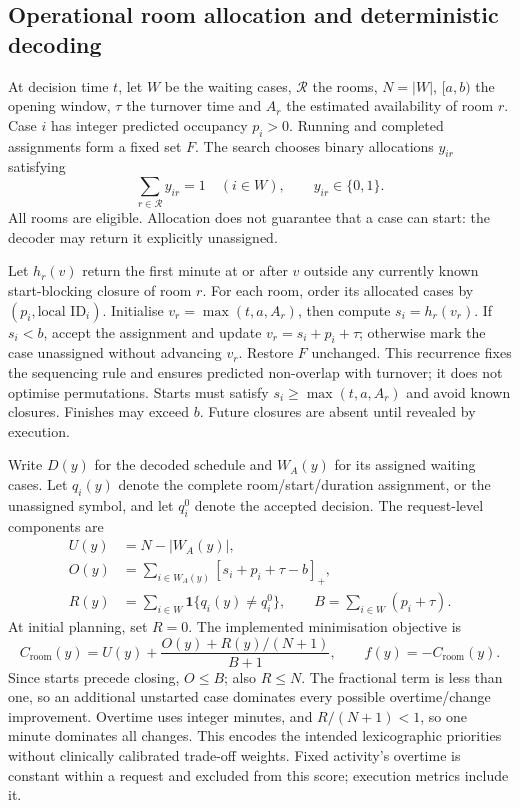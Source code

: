 \subsection{Operational room allocation and deterministic decoding}
\label{sec:room-formulation}

At decision time $t$, let $W$ be the waiting cases, $\mathcal R$ the rooms,
$N=|W|$, $[a,b)$ the opening window, $\tau$ the turnover time and $A_r$
the estimated availability of room $r$. Case $i$ has integer predicted
occupancy $p_i>0$. Running and completed assignments form a fixed set $F$.
The search chooses binary allocations $y_{ir}$ satisfying
\begin{equation}
 \sum_{r\in\mathcal R}y_{ir}=1\quad(i\in W),\qquad y_{ir}\in\{0,1\}.
\end{equation}
All rooms are eligible. Allocation does not guarantee that a case can start:
the decoder may return it explicitly unassigned.

Let $h_r(v)$ return the first minute at or after $v$ outside any currently
known start-blocking closure of room $r$. For each room, order its allocated
cases by $(p_i,\text{local ID}_i)$. Initialise $v_r=\max(t,a,A_r)$, then
compute $s_i=h_r(v_r)$. If $s_i<b$, accept the assignment and update
$v_r=s_i+p_i+\tau$; otherwise mark the case unassigned without advancing
$v_r$. Restore $F$ unchanged. This recurrence fixes the sequencing rule and
ensures predicted non-overlap with turnover; it does not optimise permutations.
Starts must satisfy $s_i\geq\max(t,a,A_r)$ and avoid known closures. Finishes
may exceed $b$. Future closures are absent until revealed by execution.

Write $D(y)$ for the decoded schedule and $W_A(y)$ for its assigned waiting
cases. Let $q_i(y)$ denote the complete room/start/duration assignment,
or the unassigned symbol, and let $q_i^0$ denote the accepted decision.
The request-level components are
\begin{align}
 U(y)&=N-|W_A(y)|,\\
 O(y)&=\sum_{i\in W_A(y)}[s_i+p_i+\tau-b]_+,\\
 R(y)&=\sum_{i\in W}\mathbf{1}\{q_i(y)\ne q_i^0\},
 \qquad B=\sum_{i\in W}(p_i+\tau).
\end{align}
At initial planning, set $R=0$. The implemented minimisation objective is
\begin{equation}
 C_{\mathrm{room}}(y)=U(y)+\frac{O(y)+R(y)/(N+1)}{B+1},
 \qquad f(y)=-C_{\mathrm{room}}(y).
 \label{eq:room-cost}
\end{equation}
Since starts precede closing, $O\leq B$; also $R\leq N$. The fractional
term is less than one, so an additional unstarted case dominates every
possible overtime/change improvement. Overtime uses integer minutes, and
$R/(N+1)<1$, so one minute dominates all changes. This encodes the intended
lexicographic priorities without clinically calibrated trade-off weights.
Fixed activity's overtime is constant within a request and excluded from
this score; execution metrics include it.

